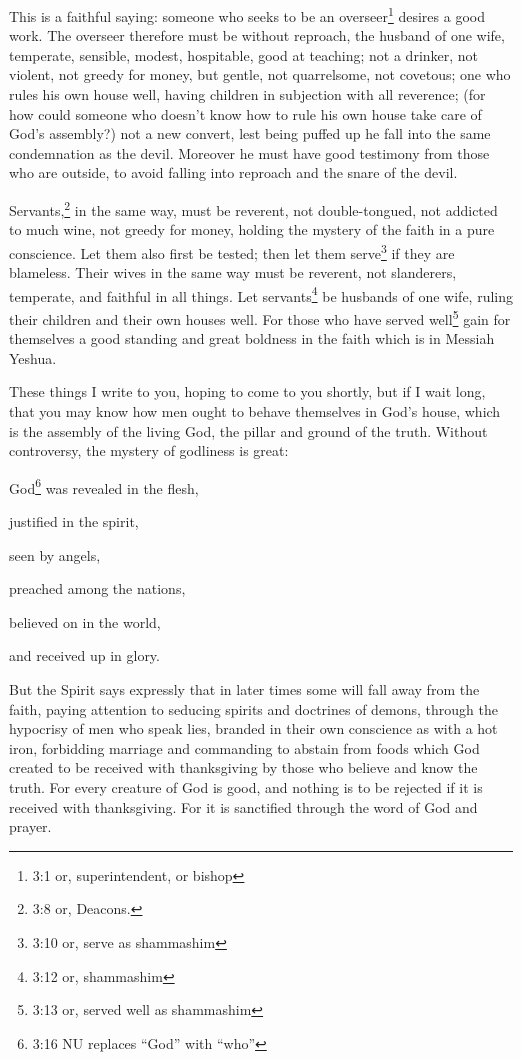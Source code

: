 \mychapter{} \myverse*{}This is a faithful saying: someone who seeks to be an overseer\footnote{3:1 or, superintendent, or bishop} desires a good work.
\myverse{}The overseer therefore must be without reproach, the husband of one wife, temperate,
sensible, modest, hospitable, good at teaching;
\myverse{}not a drinker, not violent, not greedy for money, but gentle, not quarrelsome,
not covetous;
\myverse{}one who rules his own house well, having children in subjection with all reverence;
\myverse{}(for how could someone who doesn’t know how to rule his own house take care
of God’s assembly?)
\myverse{}not a new convert, lest being puffed up he fall into the same condemnation as
the devil.
\myverse{}Moreover he must have good testimony from those who are outside, to avoid falling
into reproach and the snare of the devil.

\myverse{}Servants,\footnote{3:8 or, Deacons.} in the same way, must be reverent, not double-tongued, not addicted to
much wine, not greedy for money,
\myverse{}holding the mystery of the faith in a pure conscience.
\myverse{}Let them also first be tested; then let them serve\footnote{3:10 or, serve as shammashim} if they are blameless.
\myverse{}Their wives in the same way must be reverent, not slanderers, temperate, and
faithful in all things.
\myverse{}Let servants\footnote{3:12 or, shammashim} be husbands of one wife, ruling their children and their own houses well.
\myverse{}For those who have served well\footnote{3:13 or, served well as shammashim} gain for themselves a good standing and great boldness
in the faith which is in Messiah Yeshua.

\myverse{}These things I write to you, hoping to come to you shortly,
\myverse{}but if I wait long, that you may know how men ought to behave themselves in
God’s house, which is the assembly of the living God, the pillar and ground of the truth.
\myverse{}Without controversy, the mystery of godliness is great:

God\footnote{3:16 NU replaces “God” with “who”} was revealed in the flesh,

justified in the spirit,

seen by angels,

preached among the nations,

believed on in the world,

and received up in glory.


\mychapter{} \myverse*{}But the Spirit says expressly that in later times some will fall
away from the faith, paying attention to seducing spirits and doctrines of demons,
\myverse{}through the hypocrisy of men who speak lies, branded in their own conscience
as with a hot iron,
\myverse{}forbidding marriage and commanding to abstain from foods which God created to
be received with thanksgiving by those who believe and know the truth.
\myverse{}For every creature of God is good, and nothing is to be rejected if it is received
with thanksgiving.
\myverse{}For it is sanctified through the word of God and prayer.

